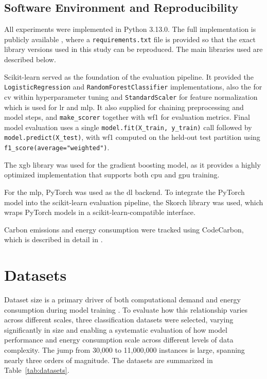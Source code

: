\subsection{Software Environment and Reproducibility}
\label{implementation_sw_env}

All experiments were implemented in Python 3.13.0. The full implementation is  publicly available \cite{BThesisQorri}, where a \texttt{requirements.txt} file is provided so that the exact library versions used in this study can be reproduced. The main libraries used are described below.

Scikit-learn served as the foundation of the evaluation pipeline. It provided the \texttt{LogisticRegression} and \texttt{RandomForestClassifier} implementations, also the  for \gls{cv} within hyperparameter tuning and \texttt{StandardScaler} for feature normalization which is used for \gls{lr} and \gls{mlp}. It also supplied  for chaining preprocessing and model steps, and \texttt{make\_scorer} together with \gls{wf1} for evaluation metrics. Final model evaluation uses a single \texttt{model.fit(X\_train, y\_train)} call followed by \texttt{model.predict(X\_test)}, with \gls{wf1} computed on the held-out test partition using \texttt{f1\_score(average="weighted")}.

The \gls{xgb} library was used for the gradient boosting model, as it provides a highly optimized implementation that supports both \gls{cpu} and \gls{gpu} training.

For the \gls{mlp}, PyTorch \cite{paszkePyTorchImperativeStyle2019} was used as the \gls{dl} backend. To integrate the PyTorch model into the scikit-learn evaluation pipeline, the Skorch library \cite{ghoshSkorchBridgePyTorch2024} was used, which wraps PyTorch models in a scikit-learn-compatible interface.

Carbon emissions and energy consumption were tracked using CodeCarbon, which is described in detail in .

\section{Datasets}
\label{experimental_dataset}
\label{implementation_datasets}
\label{implementation_data_loading}

Dataset size is a primary driver of both computational demand and energy consumption during model training \cite{rodriguezEvaluatingEnergyConsumption2024}. To evaluate how this relationship varies across different scales, three classification datasets were selected, varying significantly in size and enabling a systematic evaluation of how model performance and energy consumption scale across different levels of data complexity. The jump from 30,000 to 11,000,000 instances is large, spanning nearly three orders of magnitude. The datasets are summarized in Table~\ref{tab:datasets}.

